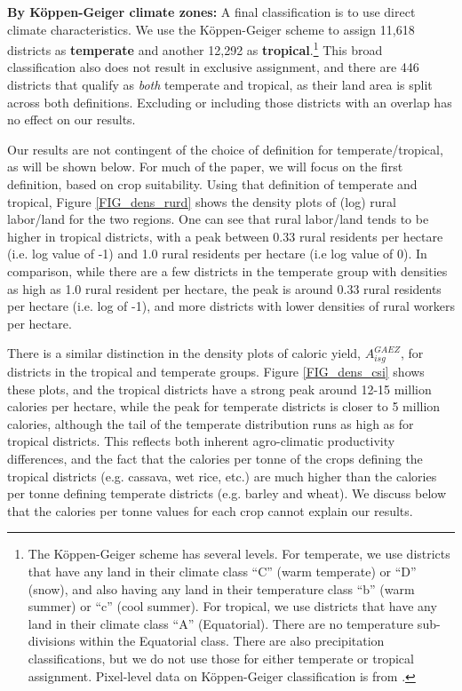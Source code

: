 \documentclass[11pt]{article}
\begin{document}
\vspace{.5cm}\noindent\textbf{By K{\"o}ppen-Geiger climate zones:} A final classification is to use direct climate characteristics. We use the K{\"o}ppen-Geiger scheme to assign 11,618 districts as \textbf{temperate} and another 12,292 as \textbf{tropical}.\footnote{The K{\"o}ppen-Geiger scheme has several levels. For temperate, we use districts that have any land in their climate class ``C'' (warm temperate) or ``D'' (snow), and also having any land in their temperature class ``b'' (warm summer) or ``c'' (cool summer). For tropical, we use districts that have any land in their climate class ``A'' (Equatorial). There are no temperature sub-divisions within the Equatorial class. There are also precipitation classifications, but we do not use those for either temperate or tropical assignment. Pixel-level data on K{\"o}ppen-Geiger classification is from \cite{kottek2006}.} This broad classification also does not result in exclusive assignment, and there are 446 districts that qualify as \textit{both} temperate and tropical, as their land area is split across both definitions. Excluding or including those districts with an overlap has no effect on our results.

\vspace{.5cm} 
Our results are not contingent of the choice of definition for temperate/tropical, as will be shown below. For much of the paper, we will focus on the first definition, based on crop suitability. Using that definition of temperate and tropical, Figure \ref{FIG_dens_rurd} shows the density plots of (log) rural labor/land for the two regions. One can see that rural labor/land tends to be higher in tropical districts, with a peak between 0.33 rural residents per hectare (i.e. log value of -1) and 1.0 rural residents per hectare (i.e log value of 0). In comparison, while there are a few districts in the temperate group with densities as high as 1.0 rural resident per hectare, the peak is around 0.33 rural residents per hectare (i.e. log of -1), and more districts with lower densities of rural workers per hectare. 

There is a similar distinction in the density plots of caloric yield, $A_{isg}^{GAEZ}$, for districts in the tropical and temperate groups. Figure \ref{FIG_dens_csi} shows these plots, and the tropical districts have a strong peak around 12-15 million calories per hectare, while the peak for temperate districts is closer to 5 million calories, although the tail of the temperate distribution runs as high as for tropical districts. This reflects both inherent agro-climatic productivity differences, and the fact that the calories per tonne of the crops defining the tropical districts (e.g. cassava, wet rice, etc.) are much higher than the calories per tonne defining temperate districts (e.g. barley and wheat). We discuss below that the calories per tonne values for each crop cannot explain our results.
\end{document}
